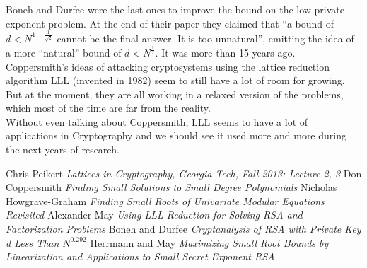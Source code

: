 \documentclass[a4paper,11pt]{article}
\begin{document}
Boneh and Durfee were the last ones to improve the bound on the low private exponent problem. At the end of their paper they claimed that ``a bound of $d<N^{1-\frac{1}{\sqrt{2}}}$ cannot be the final answer. It is too unnatural'', emitting the idea of a more ``natural'' bound of $d < N^{\frac{1}{2}}$. It was more than 15 years ago.\\
Coppersmith's ideas of attacking cryptosystems using the lattice reduction algorithm LLL (invented in 1982) seem to still have a lot of room for growing. But at the moment, they are all working in a relaxed version of the problems, which most of the time are far from the reality.\\
Without even talking about Coppersmith, LLL seems to have a lot of applications in Cryptography and we should see it used more and more during the next years of research.


\newpage
\begin{thebibliography}{1}

 Chris Peikert {\em Lattices in Cryptography, Georgia Tech, Fall 2013: Lecture 2, 3}
 Don Coppersmith {\em Finding Small Solutions to Small Degree Polynomials}
 Nicholas Howgrave-Graham {\em Finding Small Roots of Univariate Modular Equations Revisited}
 Alexander May {\em Using LLL-Reduction for Solving RSA and Factorization Problems}
 Boneh and Durfee {\em Cryptanalysis of RSA with Private Key d Less Than $N^{0.292}$}
 Herrmann and May {\em Maximizing Small Root Bounds by Linearization and Applications to Small Secret Exponent RSA}


\end{thebibliography}
\end{document}
